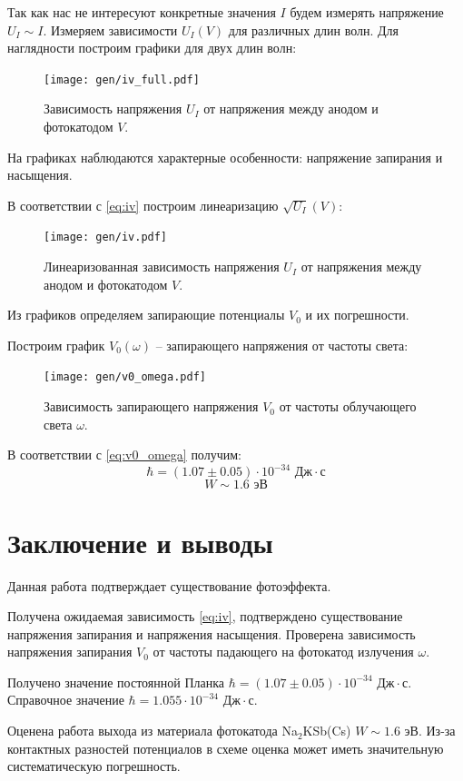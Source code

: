 \documentclass[12pt,a4paper]{article}
\begin{document}
	Так как нас не интересуют конкретные значения $I$ будем измерять напряжение $U_I \sim I$.
	Измеряем зависимости $U_I(V)$ для различных длин волн. Для наглядности построим графики для двух длин волн:
	
	\begin{figure}[H]
		\centering
		\texttt{[image: gen/iv\_full.pdf]}
		\caption{\centering
			Зависимость напряжения $U_I$ от напряжения между анодом и фотокатодом $V$.}
		\label{fig:iv_full}
	\end{figure}
	
	На графиках наблюдаются характерные особенности: напряжение запирания и насыщения.
	
	В соответствии с \eqref{eq:iv} построим линеаризацию $\sqrt{U_I}(V)$:
	
	\begin{figure}[H]
		\centering
		\texttt{[image: gen/iv.pdf]}
		\caption{\centering
				 Линеаризованная зависимость напряжения $U_I$ от напряжения между анодом и фотокатодом $V$.}
		\label{fig:iv}
	\end{figure}
	
	Из графиков определяем запирающие потенциалы $V_0$ и их погрешности.

	Построим график $V_0(\omega)$ -- запирающего напряжения от частоты света:
	
	\begin{figure}[H]
		\centering
		\texttt{[image: gen/v0\_omega.pdf]}
		\caption{\centering
			Зависимость запирающего напряжения $V_0$ от частоты облучающего света $\omega$.}
		\label{fig:v0_omega}
	\end{figure}
	
	В соответствии с \eqref{eq:v0_omega} получим:
	$$\hbar = (1.07 \pm 0.05)\cdot 10^{-34} \text{ Дж}\cdot\text{с}$$
	$$W \sim 1.6 \text{ эВ}$$
	
	\section*{Заключение и выводы}
	
	Данная работа подтверждает существование фотоэффекта.
	
	Получена ожидаемая зависимость \eqref{eq:iv}, подтверждено существование напряжения запирания и напряжения насыщения. Проверена зависимость напряжения запирания $V_0$ от частоты падающего на фотокатод излучения $\omega$.
	
	Получено значение постоянной Планка $\hbar = (1.07 \pm 0.05)\cdot 10^{-34} \text{ Дж}\cdot\text{с}$. Справочное значение $\hbar = 1.055\cdot 10^{-34} \text{ Дж}\cdot\text{с}$.

	Оценена работа выхода из материала фотокатода Na$_2$KSb(Cs) $W \sim 1.6 \text{ эВ}$. Из-за контактных разностей потенциалов в схеме оценка может иметь значительную систематическую погрешность.
	
	
\end{document}
